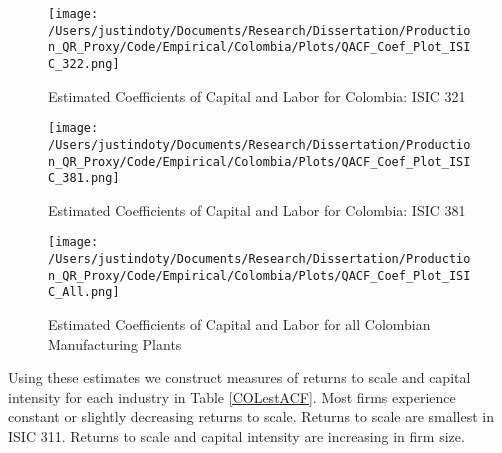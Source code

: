 \documentclass[11pt]{article}
\begin{document}
\begin{figure}[H]
\centering
\caption{Estimated Coefficients of Capital and Labor for Colombia: ISIC 321}
\texttt{[image: /Users/justindoty/Documents/Research/Dissertation/Production\_QR\_Proxy/Code/Empirical/Colombia/Plots/QACF\_Coef\_Plot\_ISIC\_322.png]}
\label{fig:ACFCOL321}
\end{figure}

\begin{figure}[H]
\centering
\caption{Estimated Coefficients of Capital and Labor for Colombia: ISIC 381}
\texttt{[image: /Users/justindoty/Documents/Research/Dissertation/Production\_QR\_Proxy/Code/Empirical/Colombia/Plots/QACF\_Coef\_Plot\_ISIC\_381.png]}
\label{fig:ACFCOL381}
\end{figure}

\begin{figure}[H]
\centering
\caption{Estimated Coefficients of Capital and Labor for all Colombian Manufacturing Plants}
\texttt{[image: /Users/justindoty/Documents/Research/Dissertation/Production\_QR\_Proxy/Code/Empirical/Colombia/Plots/QACF\_Coef\_Plot\_ISIC\_All.png]}
\label{fig:ACFCOLall}
\end{figure}

Using these estimates we construct measures of returns to scale and capital intensity for each industry in Table \ref{COLestACF}. Most firms experience constant or slightly decreasing returns to scale. Returns to scale are smallest in ISIC 311. Returns to scale and capital intensity are increasing in firm size.
\end{document}
